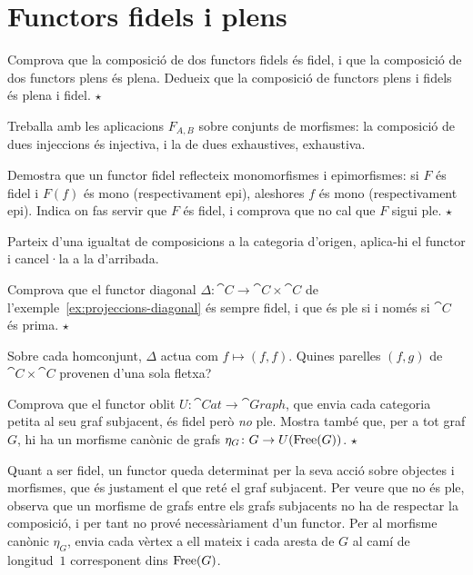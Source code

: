 \section{Functors fidels i plens}

\begin{exercici}
Comprova que la composició de dos functors fidels és fidel, i que la composició de dos functors plens és plena. Dedueix que la composició de functors plens i fidels és plena i fidel. \hfill{\normalfont$\star$}
\begin{indicacio}
Treballa amb les aplicacions $F_{A,B}$ sobre conjunts de morfismes: la composició de dues injeccions és injectiva, i la de dues exhaustives, exhaustiva.
\end{indicacio}
\end{exercici}

\begin{exercici}
Demostra que un functor fidel reflecteix monomorfismes i epimorfismes: si $F$ és fidel i $F(f)$ és mono (respectivament epi), aleshores $f$ és mono (respectivament epi). Indica on fas servir que $F$ és fidel, i comprova que no cal que $F$ sigui ple. \hfill{\normalfont$\star$}
\begin{indicacio}
Parteix d'una igualtat de composicions a la categoria d'origen, aplica-hi el functor i cancel·la a la d'arribada.
\end{indicacio}
\end{exercici}

\begin{exercici}
Comprova que el functor diagonal $\Delta\colon\cat{C}\to\cat{C}\times\cat{C}$ de l'exemple~\ref{ex:projeccions-diagonal} és sempre fidel, i que és ple si i només si $\cat{C}$ és prima. \hfill{\normalfont$\star$}
\begin{indicacio}
Sobre cada homconjunt, $\Delta$ actua com $f\mapsto(f,f)$. Quines parelles $(f,g)$ de $\cat{C}\times\cat{C}$ provenen d'una sola fletxa?
\end{indicacio}
\end{exercici}

\begin{exercici}
Comprova que el functor oblit $U\colon\cat{Cat}\to\cat{Graph}$, que envia cada categoria petita al seu graf subjacent, és fidel però \emph{no} ple. Mostra també que, per a tot graf $G$, hi ha un morfisme canònic de grafs $\eta_G\colon G\to U(\operatorname{Free}(G))$. \hfill{\normalfont$\star$}
\begin{indicacio}
Quant a ser fidel, un functor queda determinat per la seva acció sobre objectes i morfismes, que és justament el que reté el graf subjacent. Per veure que no és ple, observa que un morfisme de grafs entre els grafs subjacents no ha de respectar la composició, i per tant no prové necessàriament d'un functor. Per al morfisme canònic $\eta_G$, envia cada vèrtex a ell mateix i cada aresta de $G$ al camí de longitud~$1$ corresponent dins $\operatorname{Free}(G)$.
\end{indicacio}
\end{exercici}


